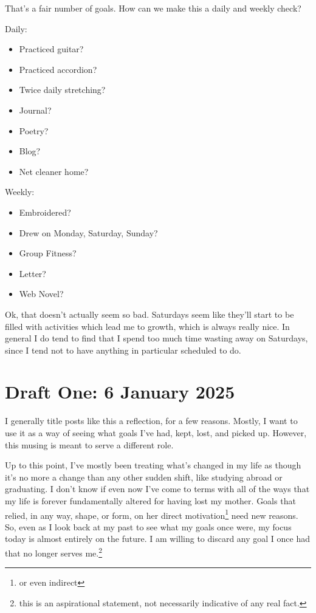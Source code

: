 \documentclass[12pt]{article}[titlepage]
\renewcommand{\,}{\textsuperscript{,}}
\begin{document}
That's a fair number of goals.  
How can we make this a daily and weekly check?

Daily:  
\begin{itemize}  
\item Practiced guitar?  
\item Practiced accordion?  
\item Twice daily stretching?  
\item Journal?  
\item Poetry?  
\item Blog?  
\item Net cleaner home?  
\end{itemize}  
Weekly:  
\begin{itemize}  
\item Embroidered?  
\item Drew on Monday, Saturday, Sunday?  
\item Group Fitness?  
\item Letter?  
\item Web Novel?  
\end{itemize}

Ok, that doesn't actually seem so bad. Saturdays seem like they'll start to be filled with activities which lead me to growth, which is always really nice. In general I do tend to find that I spend too much time wasting away on Saturdays, since I tend not to have anything in particular scheduled to do.  

\section{Draft One: 6 January 2025}  
I generally title posts like this a reflection, for a few reasons.  
Mostly, I want to use it as a way of seeing what goals I've had, kept, lost, and picked up.  
However, this musing is meant to serve a different role.

Up to this point, I've mostly been treating what's changed in my life as though it's no more a change than any other sudden shift, like studying abroad or graduating.  
I don't know if even now I've come to terms with all of the ways that my life is forever fundamentally altered for having lost my mother.  
Goals that relied, in any way, shape, or form, on her direct motivation\footnote{or even indirect} need new reasons.  
So, even as I look back at my past to see what my goals once were, my focus today is almost entirely on the future.  
I am willing to discard any goal I once had that no longer serves me.\footnote{this is an aspirational statement, not necessarily indicative of any real fact.}
\end{document}
